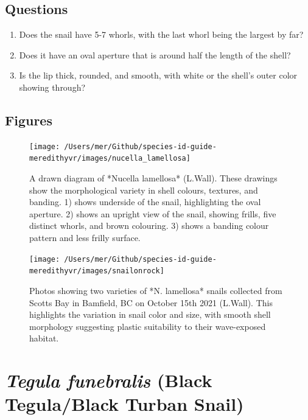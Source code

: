 \documentclass[
]{article}
\begin{document}
\hypertarget{questions}{%
\subsection{Questions}\label{questions}}

\begin{enumerate}
\def\labelenumi{\arabic{enumi})}
\item
  Does the snail have 5-7 whorls, with the last whorl being the largest
  by far?
\item
  Does it have an oval aperture that is around half the length of the
  shell?
\item
  Is the lip thick, rounded, and smooth, with white or the shell's outer
  color showing through?
\end{enumerate}

\newpage

\hypertarget{figures-1}{%
\subsection{Figures}\label{figures-1}}

\begin{figure}

\texttt{[image: /Users/mer/Github/species-id-guide-meredithyvr/images/nucella\_lamellosa]} \hfill{}

\caption{A drawn diagram of *Nucella lamellosa* (L.Wall). These drawings show the morphological variety in shell colours, textures, and banding. 1) shows underside of the snail, highlighting the oval aperture. 2) shows an upright view of the snail, showing frills, five distinct whorls, and brown colouring. 3) shows a banding colour pattern and less frilly surface.}\label{fig:Nucella_lamellosa}
\end{figure}

\begin{figure}

\texttt{[image: /Users/mer/Github/species-id-guide-meredithyvr/images/snailonrock]} \hfill{}

\caption{Photos showing two varieties of *N. lamellosa* snails collected from Scotts Bay in Bamfield, BC on October 15th 2021 (L.Wall). This highlights the variation in snail color and size, with smooth shell morphology suggesting plastic suitability to their wave-exposed habitat. }\label{fig:SnailonRock}
\end{figure}

\newpage

\hypertarget{tegula-funebralis-black-tegulablack-turban-snail}{%
\section{\texorpdfstring{\emph{Tegula funebralis} (Black Tegula/Black
Turban
Snail)}{Tegula funebralis (Black Tegula/Black Turban Snail)}}\label{tegula-funebralis-black-tegulablack-turban-snail}}
\end{document}
